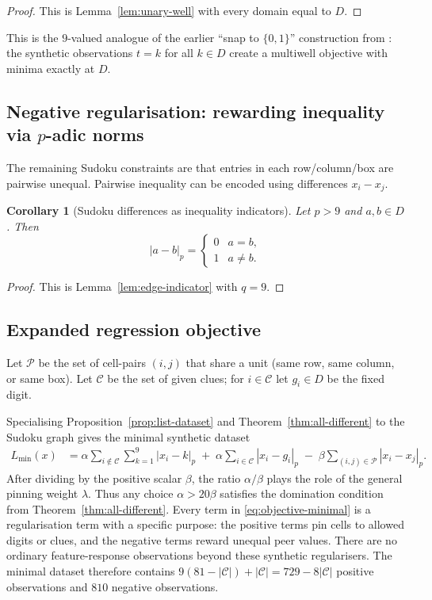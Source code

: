 \documentclass[11pt]{article}
\newtheorem{corollary}[theorem]{Corollary}
\begin{document}
\begin{proof}
This is Lemma~\ref{lem:unary-well} with every domain equal to \(D\).
\end{proof}

This is the $9$-valued analogue of the earlier ``snap to $\{0,1\}$'' construction from \cite{baker2026nphard}: the synthetic observations $t=k$ for all $k\in D$ create a multiwell objective with minima exactly at $D$.

\subsection{Negative regularisation: rewarding inequality via $p$-adic norms}

The remaining Sudoku constraints are that entries in each row/column/box are pairwise unequal. Pairwise inequality can be encoded using differences $x_i-x_j$.

\begin{corollary}[Sudoku differences as inequality indicators]
\label{cor:sudoku-differences}
Let $p>9$ and $a,b\in D$. Then
\[
|a-b|_p =
\begin{cases}
0 & a=b,\\
1 & a\neq b.
\end{cases}
\]
\end{corollary}

\begin{proof}
This is Lemma~\ref{lem:edge-indicator} with \(q=9\).
\end{proof}

\subsection{Expanded regression objective}
Let $\mathcal{P}$ be the set of cell-pairs $(i,j)$ that share a unit (same row, same column, or same box). Let $\mathcal{C}$ be the set of given clues; for $i\in\mathcal{C}$ let $g_i\in D$ be the fixed digit.

Specialising Proposition~\ref{prop:list-dataset} and Theorem~\ref{thm:all-different} to the Sudoku graph gives the minimal synthetic dataset
\begin{align}
L_{\min}(x) &=
\alpha\sum_{i\notin\mathcal{C}}\sum_{k=1}^9 |x_i-k|_p
\;+\;
\alpha\sum_{i\in\mathcal{C}} |x_i-g_i|_p
\;-\;
\beta\sum_{(i,j)\in\mathcal{P}} |x_i-x_j|_p.
\label{eq:objective-minimal}
\end{align}
After dividing by the positive scalar \(\beta\), the ratio \(\alpha/\beta\) plays the role of the general pinning weight \(\lambda\). Thus any choice \(\alpha>20\beta\) satisfies the domination condition from Theorem~\ref{thm:all-different}. Every term in \eqref{eq:objective-minimal} is a regularisation term with a specific purpose: the positive terms pin cells to allowed digits or clues, and the negative terms reward unequal peer values. There are no ordinary feature-response observations beyond these synthetic regularisers. The minimal dataset therefore contains \(9(81-|\mathcal C|)+|\mathcal C|=729-8|\mathcal C|\) positive observations and \(810\) negative observations.
\end{document}
